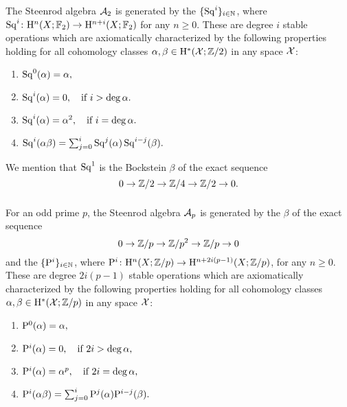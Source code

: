 %

\subsubsection{} 
The Steenrod algebra $\mathcal{A}_2$ is generated by the  $\{\operatorname{Sq}^i\}_{i \in \mathbb{N}}$, where $\operatorname{Sq}^i \colon \mathrm{H}^n(X; {\mathbb{F}_2}) \to \mathrm{H}^{n+i}(X; {\mathbb{F}_2})$ for any $n\geq 0$.
These are degree $i$ stable operations which are axiomatically characterized by the following properties holding for all cohomology classes $\alpha,\beta \in \mathrm{H}^*(\mathcal{X}; \mathbb{Z}/2)$ in any space $\mathcal{X}$:
\begin{enumerate}
	\item \(\operatorname{Sq}^0(\alpha) = \alpha,\)
	\item \(\operatorname{Sq}^i(\alpha) = 0, \quad \text{if } i > \deg\alpha.\)
	\item \(\operatorname{Sq}^i(\alpha) = \alpha^2, \quad \text{if } i = \deg\alpha.\)
	\item \(\operatorname{Sq}^i(\alpha \beta) = \textstyle\sum_{j=0}^{i} \operatorname{Sq}^j(\alpha) \operatorname{Sq}^{i-j}(\beta).\)
\end{enumerate}
We mention that $\operatorname{Sq}^1$ is the Bockstein $\beta$ of the exact sequence
\[
0 \to \mathbb{Z}/2 \to \mathbb{Z}/4 \to \mathbb{Z}/2 \to 0.
\]

\subsubsection{} For an odd prime \(p\), the Steenrod algebra $\mathcal{A}_p$ is generated by the  \(\beta\) of the exact sequence
\[
0 \to \mathbb{Z}/p \to \mathbb{Z}/p^2 \to \mathbb{Z}/p \to 0
\]
and the  \(\{\mathrm{P}^i\}_{i \in \mathbb{N}}\), where $\mathrm{P}^i \colon \mathrm{H}^n(X; \mathbb{Z}/p) \to \mathrm{H}^{n+2i(p-1)}(X; \mathbb{Z}/p)$, for any $n\geq 0$.
These are degree \(2i(p-1)\) stable operations which are axiomatically characterized by the following properties holding for all cohomology classes \(\alpha, \beta \in \mathrm{H}^*(\mathcal{X}; \mathbb{Z}/p)\) in any space \(\mathcal{X}\):

\begin{enumerate}
	\item \(\mathrm{P}^0(\alpha) = \alpha,\)
	\item \(\mathrm{P}^i(\alpha) = 0, \quad \text{if } 2i > \deg\alpha,\)
	\item \(\mathrm{P}^i(\alpha) = \alpha^p, \quad \text{if } 2i = \deg\alpha,\)
	\item \(\mathrm{P}^i(\alpha \beta) = \textstyle\sum_{j=0}^{i} \mathrm{P}^j(\alpha) \mathrm{P}^{i-j}(\beta).\)
\end{enumerate}